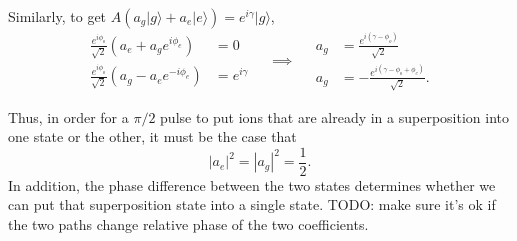 Similarly, to get $A\left(a_g|g\rangle+a_e|e\rangle\right)=e^{i\gamma}|g\rangle$,
\begin{equation}
\begin{aligned}
\frac{e^{i\phi_o}}{\sqrt{2}}\left(a_e+a_ge^{i\phi_e}\right) &= 0 \\
\frac{e^{i\phi_o}}{\sqrt{2}}\left(a_g-a_e e^{-i\phi_e}\right) &= e^{i\gamma} 
\end{aligned}
\quad\implies\quad
\begin{aligned}
a_g&=\frac{e^{i(\gamma-\phi_o)}}{\sqrt{2}}\\
a_g&=-\frac{e^{i(\gamma-\phi_o+\phi_e)}}{\sqrt{2}}.
\end{aligned}
\end{equation}

Thus, in order for a $\pi/2$ pulse to put ions that are already in a superposition into one state or the other, it must be the case that 
\begin{equation}
|a_e|^2=|a_g|^2=\frac{1}{2}.
\end{equation}
In addition, the phase difference between the two states determines whether we can put that superposition state into a single state.
TODO: make sure it's ok if the two paths change relative phase of the two coefficients.
